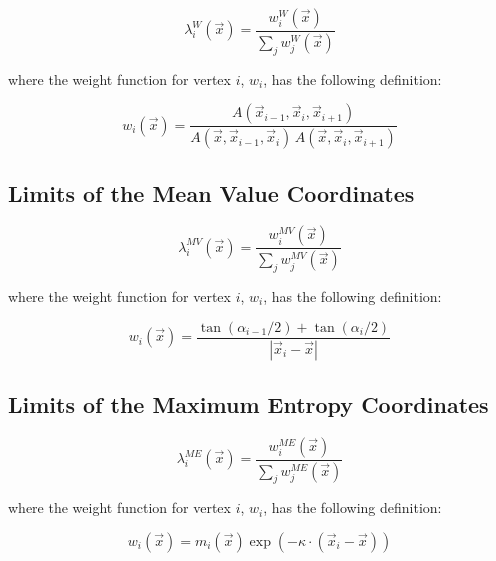 \begin{equation}
\label{eq::App_BF_WachBF}
\lambda_i^{W} (\vec{x}) = \frac{w_i^W  (\vec{x}) }{\sum_j w_j^W  (\vec{x}) }
\end{equation}

\noindent where the weight function for vertex $i$, $w_i$, has the following definition:

\begin{equation}
\label{eq::BF_wach_weights}
w_i (\vec{x})  = \frac{A(\vec{x}_{i-1}, \vec{x}_{i}, \vec{x}_{i+1})}{A(\vec{x}, \vec{x}_{i-1}, \vec{x}_{i}) \, A(\vec{x}, \vec{x}_{i}, \vec{x}_{i+1})}
\end{equation}

\subsection{Limits of the Mean Value Coordinates}
\label{sec::appendix_BF_Limits_MV}

\begin{equation}
\label{eq::App_BF_MVBF}
\lambda_i^{MV} (\vec{x}) = \frac{w_i^{MV}  (\vec{x}) }{\sum_j w_j^{MV}  (\vec{x}) }
\end{equation}

\noindent where the weight function for vertex $i$, $w_i$, has the following definition:

\begin{equation}
\label{eq::BF_MV_weights}
w_i (\vec{x})  = \frac{\tan(\alpha_{i-1} / 2) + \tan(\alpha_i / 2)}{|\vec{x}_i - \vec{x}|}
\end{equation}

\subsection{Limits of the Maximum Entropy Coordinates}
\label{sec::appendix_BF_Limits_ME}


\begin{equation}
\label{eq::App_BF_MEBF}
\lambda_i^{ME} (\vec{x}) = \frac{w_i^{ME}  (\vec{x}) }{\sum_j w_j^{ME}  (\vec{x}) }
\end{equation}

\noindent where the weight function for vertex $i$, $w_i$, has the following definition:

\begin{equation}
\label{eq::BF_ME_weights}
w_i (\vec{x})  = m_i(\vec{x}) \exp(-  \kappa \cdot (\vec{x}_i - \vec{x}))
\end{equation}


